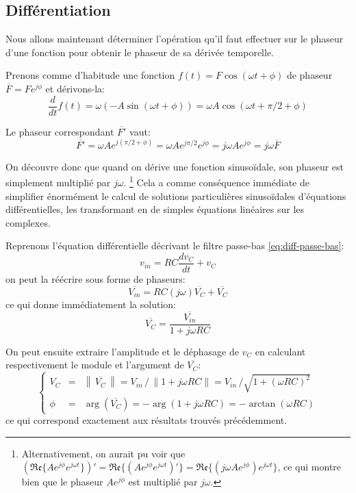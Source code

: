 \subsection{Différentiation}

Nous allons maintenant déterminer l'opération qu'il faut effectuer
sur le phaseur d'une fonction pour obtenir le phaseur de sa dérivée temporelle.

Prenons comme d'habitude une fonction $f(t) = F\cos(\omega t + \phi)$
de phaseur $\overline{F} = Fe^{j\phi}$
et dérivons-la:
\begin{equation}
    \frac{d}{dt}f(t) = \omega (-A\sin(\omega t + \phi))
    = \omega A \cos(\omega t + \pi/2 + \phi)
\end{equation}

Le phaseur correspondant $\overline{F'}$ vaut:
\begin{equation}
    \overline{F'} = \omega A e^{j(\pi/2 + \phi)} = \omega A e^{j\pi/2} e^{j\phi}
    = j\omega A e^{j\phi} = j\omega \overline{F}
\end{equation}

On découvre donc que quand on dérive une fonction sinusoïdale,
son phaseur est simplement multiplié par $j\omega$.
\footnote{
    Alternativement, on aurait pu voir que
    $(\mathfrak{Re}\{Ae^{j\phi}e^{j\omega t}\})'
    = \mathfrak{Re}\{(Ae^{j\phi}e^{j\omega t})'\}
    = \mathfrak{Re}\{(j\omega A e^{j\phi}) e^{j\omega t}\}$,
    ce qui montre bien que le phaseur $Ae^{j\phi}$ est multiplié par $j\omega$.
}
Cela a comme conséquence immédiate de simplifier énormément
le calcul de solutions particulières sinusoïdales d'équations différentielles,
les transformant en de simples équations linéaires sur les complexes.

Reprenons l'équation différentielle décrivant le filtre passe-bas
\eqref{eq:diff-passe-bas}:
\[
    v_{in} = RC\frac{dv_C}{dt} + v_C
\]
on peut la réécrire sous forme de phaseurs:
\begin{equation}
    \overline{V_{in}} = RC(j\omega)\overline{V_C} + \overline{V_C}
\end{equation}
ce qui donne immédiatement la solution:
\begin{equation}
    \overline{V_C} = \frac{\overline{V_{in}}}{1 + j\omega RC}
\end{equation}

On peut ensuite extraire l'amplitude et le déphasage de $v_C$
en calculant respectivement le module et l'argument de $\overline{V_C}$:
\begin{equation}
    \left\{
        \begin{array}{ccl}
            V_C &=& \left\|\,\overline{V_C}\,\right\|
            = V_{in}\,/\,\|1+j\omega RC\|
            = V_{in}\,/\sqrt{1 + (\omega RC)^2} \\
            \phi &=& \arg\left(\overline{V_C}\right) = -\arg(1+j\omega RC)
            = - \arctan(\omega RC)
        \end{array}
    \right.
\end{equation}
ce qui correspond exactement aux résultats trouvés précédemment.
